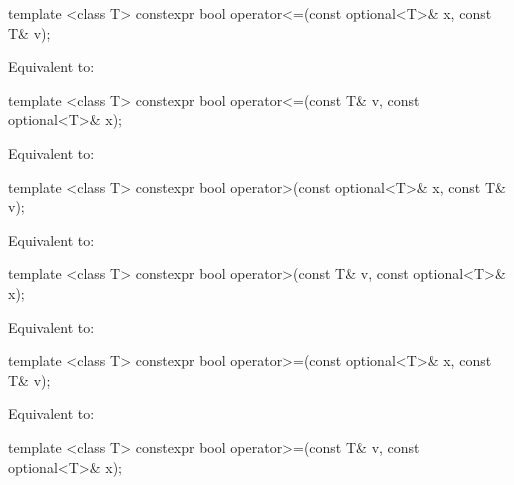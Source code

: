%
\begin{itemdecl}
template <class T> constexpr bool operator<=(const optional<T>& x, const T& v);
\end{itemdecl}

\begin{itemdescr}
\pnum
\effects
Equivalent to: 
\end{itemdescr}

%
\begin{itemdecl}
template <class T> constexpr bool operator<=(const T& v, const optional<T>& x);
\end{itemdecl}

\begin{itemdescr}
\pnum
\effects
Equivalent to: 
\end{itemdescr}

%
\begin{itemdecl}
template <class T> constexpr bool operator>(const optional<T>& x, const T& v);
\end{itemdecl}

\begin{itemdescr}
\pnum
\effects
Equivalent to: 
\end{itemdescr}

%
\begin{itemdecl}
template <class T> constexpr bool operator>(const T& v, const optional<T>& x);
\end{itemdecl}

\begin{itemdescr}
\pnum
\effects
Equivalent to: 
\end{itemdescr}

%
\begin{itemdecl}
template <class T> constexpr bool operator>=(const optional<T>& x, const T& v);
\end{itemdecl}

\begin{itemdescr}
\pnum
\effects
Equivalent to: 
\end{itemdescr}

%
\begin{itemdecl}
template <class T> constexpr bool operator>=(const T& v, const optional<T>& x);
\end{itemdecl}

